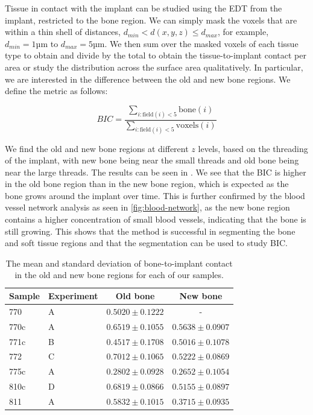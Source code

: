 Tissue in contact with the implant can be studied using the EDT from the
implant, restricted to the bone region. We can simply mask the voxels that are
within a thin shell of distances, $d_{min} < d(x,y,z) \le d_{max}$, for
example, $d_{min} = 1 \text{µm}$ to $d_{max} = 5 \text{µm}$. We then sum over
the masked voxels of each tissue type to obtain and divide by the total to
obtain the tissue-to-implant contact per area or study the distribution across
the surface area qualitatively. In particular, we are interested in the
difference between the old and new bone regions. We define the metric as
follows:

\begin{equation}
    BIC = \frac{\sum_{i : \text{field}(i) < 5} \text{bone}(i)}{\sum_{i : \text{field}(i) < 5} \text{voxels}(i)}
\end{equation}

We find the old and new bone regions at different $z$ levels, based on the
threading of the implant, with new bone being near the small threads and old
bone being near the large threads. The results can be seen in .
We see that the BIC is higher in the old bone region than in the new bone
region, which is expected as the bone grows around the implant over time. This
is further confirmed by the blood vessel network analysis as seen in
\cref{fig:blood-network}, as the new bone region contains a higher
concentration of small blood vessels, indicating that the bone is still
growing. This shows that the method is successful in segmenting the bone and
soft tissue regions and that the segmentation can be used to study BIC.



\begin{table}
    \caption{The mean and standard deviation of bone-to-implant contact in the
    old and new bone regions for each of our samples.}
    \label{tab:bic}
    \centering
    \begin{tabular}{llcc}
        \toprule
	Sample & Experiment & Old bone & New bone \\
        \midrule
	770  & A & $0.5020 \pm 0.1222$ & - \\
        770c & A & $0.6519 \pm 0.1055$ & $0.5638 \pm 0.0907$ \\
        771c & B & $0.4517 \pm 0.1708$ & $0.5016 \pm 0.1078$ \\
        772  & C & $0.7012 \pm 0.1065$ & $0.5222 \pm 0.0869$ \\
        775c & A & $0.2802 \pm 0.0928$ & $0.2652 \pm 0.1054$ \\
        810c & D & $0.6819 \pm 0.0866$ & $0.5155 \pm 0.0897$ \\
        811  & A & $0.5832 \pm 0.1015$ & $0.3715 \pm 0.0935$ \\
        \bottomrule
    \end{tabular}
\end{table}


